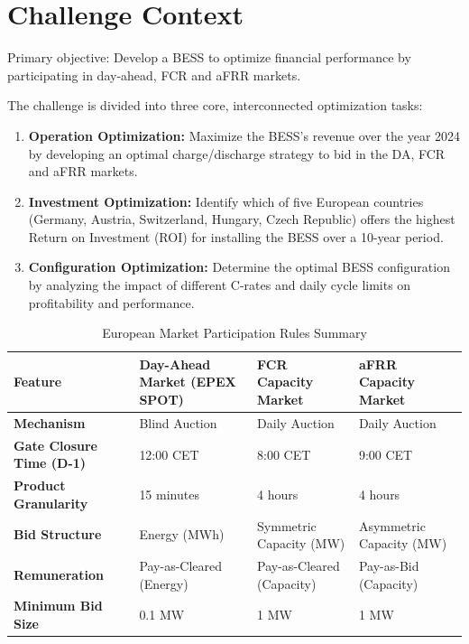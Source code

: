 \section{Challenge Context}

Primary objective: Develop a BESS to optimize financial performance by participating in day-ahead, FCR and aFRR markets.

The challenge is divided into three core, interconnected optimization tasks:
\begin{enumerate}
    \item \textbf{Operation Optimization:} Maximize the BESS's revenue over the year 2024 by developing an optimal charge/discharge strategy to bid in the DA, FCR and aFRR markets.

    \item \textbf{Investment Optimization:} Identify which of five European countries (Germany, Austria, Switzerland, Hungary, Czech Republic) offers the highest Return on Investment (ROI) for installing the BESS over a 10-year period. 

    \item \textbf{Configuration Optimization:} Determine the optimal BESS configuration by analyzing the impact of different C-rates and daily cycle limits on profitability and performance.
\end{enumerate}



\begin{table}[h!]
\centering
\caption{European Market Participation Rules Summary}
\begin{tabularx}{\textwidth}{|X|X|X|X|}
\hline
\textbf{Feature} & \textbf{Day-Ahead Market (EPEX SPOT)} & \textbf{FCR Capacity Market} & \textbf{aFRR Capacity Market} \\ \hline
\textbf{Mechanism} & Blind Auction & Daily Auction & Daily Auction \\ \hline
\textbf{Gate Closure Time (D-1)} & 12:00 CET & 8:00 CET & 9:00 CET \\ \hline
\textbf{Product Granularity} & 15 minutes & 4 hours & 4 hours \\ \hline
\textbf{Bid Structure} & Energy (MWh) & Symmetric Capacity (MW) & Asymmetric Capacity (MW) \\ \hline
\textbf{Remuneration} & Pay-as-Cleared (Energy) & Pay-as-Cleared (Capacity) & Pay-as-Bid (Capacity) \\ \hline
\textbf{Minimum Bid Size} & 0.1 MW & 1 MW & 1 MW \\ \hline
\end{tabularx}
\end{table}


